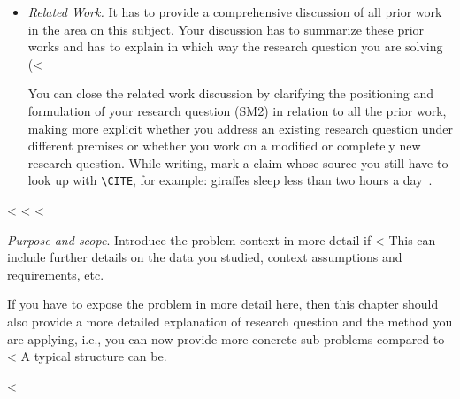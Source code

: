 {{{\begin{itemize}
  \item \emph{Related Work.}
        It has to provide a comprehensive discussion of all prior work in the area on this subject.
        Your discussion has to summarize these prior works and has to explain in which way the research question you are solving (<%

        You can close the related work discussion by clarifying the positioning and formulation of your research question (SM2) in relation to all the prior work, making more explicit whether you address an existing research question under different premises or whether you work on a modified or completely new research question.
        While writing, mark a claim whose source you still have to look up with \verb|\CITE|, for example: giraffes sleep less than two hours a day~.
\end{itemize}

<%
<%
<%

\emph{Purpose and scope}.
Introduce the problem context in more detail if <%
This can include further details on the data you studied, context assumptions and requirements, etc.

If you have to expose the problem in more detail here, then this chapter should also provide a more detailed explanation of research question and the method you are applying, i.e., you can now provide more concrete sub-problems compared to <%
A typical structure can be.

<%

}}}
